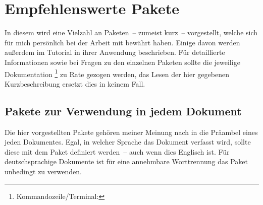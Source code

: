 \newcommand*\RecPack{%
  \hyperref[sec:packages:recommended]{Paketbeschreibung}:\xspace%
}
\section{Empfehlenswerte Pakete}
%
%
In diesem \autorefname wird eine Vielzahl an Paketen~-- zumeist kurz~-- 
vorgestellt, welche sich für mich persönlich bei der Arbeit mit  
bewährt haben. Einige davon werden außerdem im Tutorial  in 
ihrer Anwendung beschrieben. Für detaillierte Informationen sowie bei Fragen zu 
den einzelnen Paketen sollte die jeweilige Dokumentation%
\footnote{Kommandozeile/Terminal: }
zu Rate gezogen werden, das Lesen der hier gegebenen Kurzbeschreibung ersetzt 
dies in keinem Fall. 


\subsection{Pakete zur Verwendung in jedem Dokument}
Die hier vorgestellten Pakete gehören meiner Meinung nach in die Präambel eines 
jeden Dokumentes. Egal, in welcher Sprache das Dokument verfasst wird, sollte 
diese mit dem Paket  definiert werden~-- auch wenn dies 
Englisch ist. Für deutschsprachige Dokumente ist für eine annehmbare 
Worttrennung das Paket  unbedingt zu verwenden.

